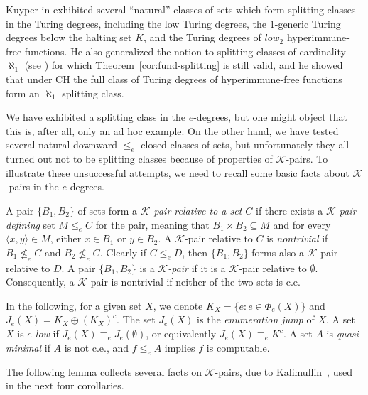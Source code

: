 \documentclass[11pt]{amsart}
\begin{document}
Kuyper in \cite{Kuyper-Muchnik} exhibited several ``natural'' classes of sets 
which form splitting classes in the Turing degrees, including the low  Turing 
degrees, the $1$-generic Turing degrees below the halting set $K$, and the 
Turing degrees of $low_2$ hyperimmune-free functions. He also generalized the 
notion to splitting classes of cardinality $\aleph_1$ (see 
\cite[Definition~6.2]{Kuyper-Muchnik}) for which 
Theorem~\ref{cor:fund-splitting} is still valid, and he showed that under CH 
the full class of Turing degrees of hyperimmune-free functions form an 
$\aleph_1$ splitting class. 


We have exhibited a splitting class in the $e$-degrees, but one might object 
that this is, after all, only an ad hoc example. On the other hand, we have 
tested several natural downward $\leq_e$-closed classes of sets, but 
unfortunately they all turned out not to be splitting classes because of 
properties of $\mathcal{K}$-pairs. To illustrate these unsuccessful attempts, 
we need to recall some basic facts about $\mathcal{K}$-pairs in the 
$e$-degrees. 

A pair $\{B_1, B_2\}$ of sets form a \emph{$\mathcal{K}$-pair relative  to a 
set $C$} if there exists a \emph{$\mathcal{K}$-pair-defining} set $M\leq_e C$ 
for the pair, meaning that $B_1 \times B_2 \subseteq M$ and for every 
$\langle x,y\rangle \in M$, either $x \in B_1$ or $y \in B_2$. A 
$\mathcal{K}$-pair relative to $C$ is \emph{nontrivial} if $B_1 \nleq_e C$ 
and $B_2\nleq_e C$. Clearly if $C\leq_e D$, then $\{B_1, B_2\}$ forms also a 
$\mathcal{K}$-pair relative to $D$. A pair $\{B_1, B_2\}$ is a 
\emph{$\mathcal{K}$-pair} if it is a $\mathcal{K}$-pair relative to 
$\emptyset$. Consequently, a $\mathcal{K}$-pair is nontrivial if neither of 
the two sets is c.e. 

In the following, for a given set $X$, we denote $K_X=\{e: e \in \Phi_e(X)\}$ 
and $J_e(X)= K_X \oplus (K_X)^c$. The set $J_e(X)$ is the \emph{enumeration 
jump} of $X$. A set $X$ is \emph{$e$-low} if $J_e(X)\equiv_e J_e(\emptyset)$, 
or equivalently $J_e(X)\equiv_e K^c$. A set $A$ is \emph{quasi-minimal} if 
$A$ is not c.e., and $f \leq_e A$ implies $f$ is computable. 

The following lemma collects several facts on $\mathcal{K}$-pairs, due to 
Kalimullin~\cite{Kalimullin}, used in the next four corollaries. 
\end{document}
